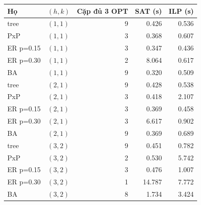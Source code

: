 \begin{tabular}{llrrr}
\toprule
Họ & $(h,k)$ & Cặp đủ 3 OPT & SAT (s) & ILP (s)\\
\midrule
tree & $(1,1)$ & 9 & 0.426 & 0.536\\
PxP & $(1,1)$ & 3 & 0.368 & 0.607\\
ER p=0.15 & $(1,1)$ & 3 & 0.347 & 0.436\\
ER p=0.30 & $(1,1)$ & 2 & 8.064 & 0.617\\
BA & $(1,1)$ & 9 & 0.320 & 0.509\\
tree & $(2,1)$ & 9 & 0.428 & 0.538\\
PxP & $(2,1)$ & 3 & 0.418 & 2.107\\
ER p=0.15 & $(2,1)$ & 3 & 0.369 & 0.458\\
ER p=0.30 & $(2,1)$ & 3 & 6.617 & 0.902\\
BA & $(2,1)$ & 9 & 0.369 & 0.689\\
tree & $(3,2)$ & 9 & 0.451 & 0.782\\
PxP & $(3,2)$ & 2 & 0.530 & 5.742\\
ER p=0.15 & $(3,2)$ & 3 & 0.476 & 1.007\\
ER p=0.30 & $(3,2)$ & 1 & 14.787 & 7.772\\
BA & $(3,2)$ & 8 & 1.734 & 3.424\\
\bottomrule
\end{tabular}
